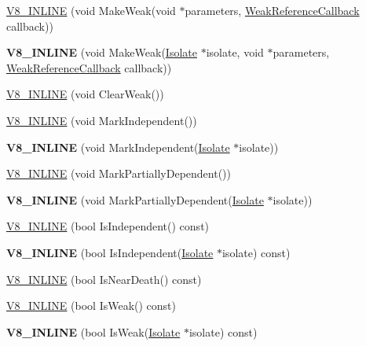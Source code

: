 \begin{DoxyCompactItemize}
\item 
\hyperlink{classv8_1_1_persistent_ab50a6cc3922980d86ef692e4a460d459}{V8\+\_\+\+I\+N\+L\+I\+N\+E} (void Make\+Weak(void $\ast$parameters, \hyperlink{namespacev8_a4d5db775dbc002b23f1b55ec7ce80ea5}{Weak\+Reference\+Callback} callback))
\item 
\hypertarget{classv8_1_1_persistent_a3b4deee5bd1f9f1d8149b3bdce1449a3}{}{\bfseries V8\+\_\+\+I\+N\+L\+I\+N\+E} (void Make\+Weak(\hyperlink{classv8_1_1_isolate}{Isolate} $\ast$isolate, void $\ast$parameters, \hyperlink{namespacev8_a4d5db775dbc002b23f1b55ec7ce80ea5}{Weak\+Reference\+Callback} callback))\label{classv8_1_1_persistent_a3b4deee5bd1f9f1d8149b3bdce1449a3}

\item 
\hyperlink{classv8_1_1_persistent_aef009f9e3c6e0ac21cdbad2907686ac3}{V8\+\_\+\+I\+N\+L\+I\+N\+E} (void Clear\+Weak())
\item 
\hyperlink{classv8_1_1_persistent_aa8497281225e9678f03b6997ae559960}{V8\+\_\+\+I\+N\+L\+I\+N\+E} (void Mark\+Independent())
\item 
\hypertarget{classv8_1_1_persistent_a2b4071c032c97886ba1bcb0ebacb2209}{}{\bfseries V8\+\_\+\+I\+N\+L\+I\+N\+E} (void Mark\+Independent(\hyperlink{classv8_1_1_isolate}{Isolate} $\ast$isolate))\label{classv8_1_1_persistent_a2b4071c032c97886ba1bcb0ebacb2209}

\item 
\hyperlink{classv8_1_1_persistent_ab096f22fc5023ba07631537633b42565}{V8\+\_\+\+I\+N\+L\+I\+N\+E} (void Mark\+Partially\+Dependent())
\item 
\hypertarget{classv8_1_1_persistent_a89a708d5a98331a2683324be9dc5a474}{}{\bfseries V8\+\_\+\+I\+N\+L\+I\+N\+E} (void Mark\+Partially\+Dependent(\hyperlink{classv8_1_1_isolate}{Isolate} $\ast$isolate))\label{classv8_1_1_persistent_a89a708d5a98331a2683324be9dc5a474}

\item 
\hyperlink{classv8_1_1_persistent_ae63945077238e19dbe1566c316c1c774}{V8\+\_\+\+I\+N\+L\+I\+N\+E} (bool Is\+Independent() const)
\item 
\hypertarget{classv8_1_1_persistent_a0cb1529e8138c0072f6efac79056e225}{}{\bfseries V8\+\_\+\+I\+N\+L\+I\+N\+E} (bool Is\+Independent(\hyperlink{classv8_1_1_isolate}{Isolate} $\ast$isolate) const)\label{classv8_1_1_persistent_a0cb1529e8138c0072f6efac79056e225}

\item 
\hyperlink{classv8_1_1_persistent_a480643005f3ce865ea6084a9249dbf6f}{V8\+\_\+\+I\+N\+L\+I\+N\+E} (bool Is\+Near\+Death() const)
\item 
\hyperlink{classv8_1_1_persistent_ab3ecacdf4c67a295d57658e348153b6c}{V8\+\_\+\+I\+N\+L\+I\+N\+E} (bool Is\+Weak() const)
\item 
\hypertarget{classv8_1_1_persistent_acfa08355e94e227b6319123d40cd8710}{}{\bfseries V8\+\_\+\+I\+N\+L\+I\+N\+E} (bool Is\+Weak(\hyperlink{classv8_1_1_isolate}{Isolate} $\ast$isolate) const)\label{classv8_1_1_persistent_acfa08355e94e227b6319123d40cd8710}


\end{DoxyCompactItemize}
